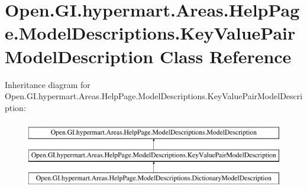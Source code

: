 \hypertarget{class_open_1_1_g_i_1_1hypermart_1_1_areas_1_1_help_page_1_1_model_descriptions_1_1_key_value_pair_model_description}{}\section{Open.\+G\+I.\+hypermart.\+Areas.\+Help\+Page.\+Model\+Descriptions.\+Key\+Value\+Pair\+Model\+Description Class Reference}
\label{class_open_1_1_g_i_1_1hypermart_1_1_areas_1_1_help_page_1_1_model_descriptions_1_1_key_value_pair_model_description}


 


Inheritance diagram for Open.\+G\+I.\+hypermart.\+Areas.\+Help\+Page.\+Model\+Descriptions.\+Key\+Value\+Pair\+Model\+Description\+:\begin{figure}[H]
\begin{center}
\leavevmode
\includegraphics[height=3.000000cm]{class_open_1_1_g_i_1_1hypermart_1_1_areas_1_1_help_page_1_1_model_descriptions_1_1_key_value_pair_model_description}
\end{center}
\end{figure}
